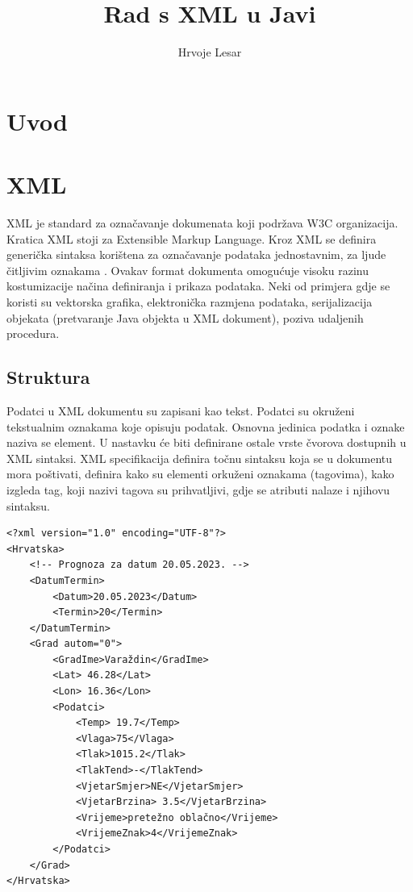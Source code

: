 \documentclass[]{foi}
\title{Rad s XML u Javi}
\author{Hrvoje Lesar}
\begin{document}
\maketitle

\tableofcontents

\makeatletter {} \makeatother
\pagestyle{plain}

\chapter{Uvod}

\chapter{XML}
XML je standard za označavanje dokumenata koji podržava W3C organizacija.
Kratica XML stoji za Extensible Markup Language. Kroz XML se definira generička
sintaksa korištena za označavanje podataka jednostavnim, za ljude čitljivim oznakama \cite{xml_in_a_nutshell}.
Ovakav format dokumenta omogućuje visoku razinu kostumizacije načina definiranja
i prikaza podataka. Neki od primjera gdje se koristi su vektorska grafika,
elektronička razmjena podataka, serijalizacija objekata (pretvaranje Java objekta u XML dokument),
poziva udaljenih procedura.

\section{Struktura}
Podatci u XML dokumentu su zapisani kao tekst. Podatci su okruženi tekstualnim oznakama
koje opisuju podatak. Osnovna jedinica podatka i oznake naziva se element. U nastavku će
biti definirane ostale vrste čvorova dostupnih u XML sintaksi. XML specifikacija definira
točnu sintaksu koja se u dokumentu mora poštivati, definira kako su elementi orkuženi
oznakama (tagovima), kako izgleda tag, koji nazivi tagova su prihvatljivi, gdje se
atributi nalaze i njihovu sintaksu.

\begin{lstlisting}[caption={Vrste čvorova}]
<?xml version="1.0" encoding="UTF-8"?>
<Hrvatska>
    <!-- Prognoza za datum 20.05.2023. -->
    <DatumTermin>
        <Datum>20.05.2023</Datum>
        <Termin>20</Termin>
    </DatumTermin>
    <Grad autom="0">
        <GradIme>Varaždin</GradIme>
        <Lat> 46.28</Lat>
        <Lon> 16.36</Lon>
        <Podatci>
            <Temp> 19.7</Temp>
            <Vlaga>75</Vlaga>
            <Tlak>1015.2</Tlak>
            <TlakTend>-</TlakTend>
            <VjetarSmjer>NE</VjetarSmjer>
            <VjetarBrzina> 3.5</VjetarBrzina>
            <Vrijeme>pretežno oblačno</Vrijeme>
            <VrijemeZnak>4</VrijemeZnak>
        </Podatci>
    </Grad>
</Hrvatska>
\end{lstlisting}
\end{document}
